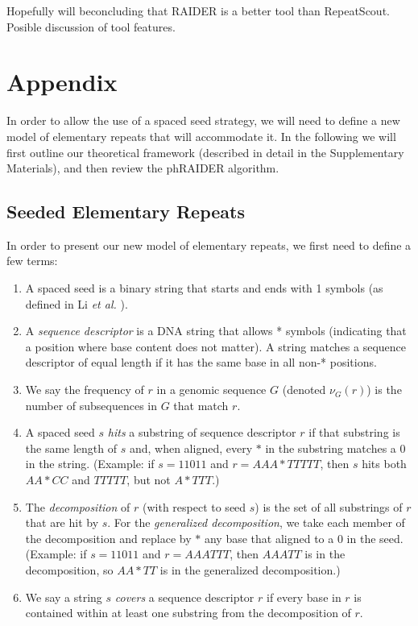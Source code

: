 \documentclass{bmcart}
\newcommand{\red}[1]{{\color{red}#1}}
\begin{document}
\red {
Hopefully will beconcluding that RAIDER is a better tool than
RepeatScout.  Posible discussion of tool features.
}

\section*{Appendix}
In order to allow the use of a spaced seed strategy, we will need to
define a new model of elementary repeats that will accommodate it.  In
the following we will first outline our theoretical framework
(described in detail in the Supplementary Materials), and then review
the phRAIDER algorithm.

\subsection*{Seeded Elementary Repeats}
In order to present our new model of elementary repeats, we first need
to define a few terms:
\begin{enumerate}
  \item A spaced seed is a binary string that starts and ends with 1
    symbols (as defined in Li {\it et al.} \cite{Li:2004wl}).
  \item A {\it sequence descriptor} is a DNA string that allows *
    symbols (indicating that a position where base content does not
    matter).  A string matches a sequence descriptor of equal length if
    it has the same base in all non-* positions.
  \item We say the frequency of $r$ in a genomic sequence $G$ (denoted
    $\nu_G(r)$) is the number of subsequences in $G$ that match $r$.
  \item A spaced seed $s$ {\it hits} a substring of sequence
    descriptor $r$ if that substring is the same length of $s$ and,
    when aligned, every $*$ in the substring matches a 0 in the
    string.  (Example: if $s=11011$ and $r=AAA*TTTTT$, then $s$
    hits both $AA*CC$ and $TTTTT$, but not $A*TTT$.)
  \item The {\it decomposition} of $r$ (with respect to seed $s$) is
    the set of all substrings of $r$ that are hit by $s$.  For the
    {\it generalized decomposition}, we take each member of the
    decomposition and replace by $*$ any base that aligned to a 0 in
    the seed.  (Example: if $s=11011$ and $r=AAATTT$, then $AAATT$ is
    in the decomposition, so $AA*TT$ is in the generalized
    decomposition.)
  \item We say a string $s$ {\it covers} a sequence descriptor $r$ if
  every base in $r$ is contained within at least one substring from
  the decomposition of $r$.
\end{enumerate}
\end{document}
